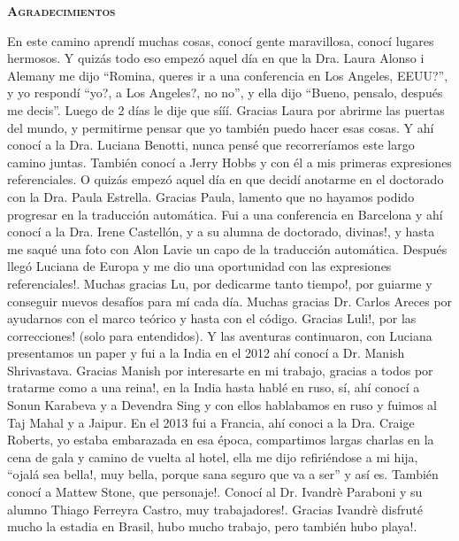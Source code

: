 \thispagestyle{empty}


\begin{center}

{ \vspace*{1cm} }
\huge{\textbf{\textsc{\textmd{Agradecimientos}}}}\\[1cm]

\end{center}

\normalsize{

En este camino aprend\'i muchas cosas, conoc\'i gente maravillosa, conoc\'i lugares hermosos. Y quiz\'as todo eso empez\'o aquel d\'ia en que la Dra. Laura Alonso i Alemany me dijo ``Romina, queres ir a una conferencia en Los Angeles, EEUU?'', y yo respond\'i ``yo?, a Los Angeles?, no no'', y ella dijo ``Bueno, pensalo, despu\'es me decis''. Luego de 2 d\'ias le dije que s\'i\'i\'i. Gracias Laura por abrirme las puertas del mundo, y permitirme pensar que yo tambi\'en puedo hacer esas cosas. Y ah\'i conoc\'i a la Dra. Luciana Benotti, nunca pens\'e que recorrer\'iamos este largo camino juntas. Tambi\'en conoc\'i a Jerry Hobbs y con \'el a mis primeras expresiones referenciales. O quiz\'as empez\'o aquel d\'ia en que decid\'i anotarme en el doctorado con la Dra. Paula Estrella. Gracias Paula, lamento que no hayamos podido progresar en la traducci\'on autom\'atica. Fui a una conferencia en Barcelona y ah\'i conoc\'i a la Dra. Irene Castell\'on, y a su alumna de doctorado, divinas!, y hasta me saqu\'e una foto con Alon Lavie un capo de la traducci\'on autom\'atica. Despu\'es lleg\'o Luciana de Europa y me dio una oportunidad con las expresiones referenciales!. Muchas gracias Lu, por dedicarme tanto tiempo!, por guiarme y conseguir nuevos desaf\'ios para m\'i cada d\'ia. Muchas gracias Dr. Carlos Areces por ayudarnos con el marco te\'orico y hasta con el c\'odigo. Gracias Luli!, por las correcciones! (solo para entendidos). Y las aventuras continuaron, con Luciana presentamos un paper y fui a la India en el 2012 ah\'i conoc\'i a Dr. Manish Shrivastava. Gracias Manish por interesarte en mi trabajo, gracias a todos por tratarme como a una reina!, en la India hasta habl\'e en ruso, s\'i, ah\'i conoc\'i a Sonun Karabeva y a Devendra Sing y con ellos hablabamos en ruso y fuimos al Taj Mahal y a Jaipur. En el 2013 fui a Francia, ah\'i conoci a la Dra. Craige Roberts, yo estaba embarazada en esa \'epoca, compartimos largas charlas en la cena de gala y camino de vuelta al hotel, ella me dijo refiri\'endose a mi hija, ``ojal\'a sea bella!, muy bella, porque sana seguro que va a ser'' y as\'i es. Tambi\'en conoc\'i a Mattew Stone, que personaje!. Conoc\'i al Dr. Ivandr\`e Paraboni y su alumno Thiago Ferreyra Castro, muy trabajadores!. Gracias Ivandr\`e disfrut\'e mucho la estadia en Brasil, hubo mucho trabajo, pero tambi\'en hubo playa!. \\
}
